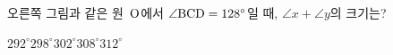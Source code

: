 \noindent\begin{minipage}[t]{0.58\linewidth}\vspace{0pt}\raggedright 오른쪽 그림과 같은 원~$\mathrm{O}$에서 $\angle\mathrm{BCD}=128^\circ$일 때, $\angle x+\angle y$의 크기는?\end{minipage}\hfill\begin{minipage}[t]{0.4\linewidth}\vspace{0pt}\centering \resizebox{\ifdim\width>\linewidth\linewidth\else\width\fi}{!}{}\end{minipage}\par
\begin{choicesii}{$292^\circ$}{$298^\circ$}{$302^\circ$}{$308^\circ$}{$312^\circ$}\end{choicesii}
